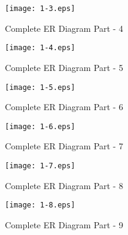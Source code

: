 \begin{figure}
\centering
\caption{Complete ER Diagram Part - 4}
\texttt{[image: 1-3.eps]}
\end{figure}

\begin{figure}
\centering
\caption{Complete ER Diagram Part - 5}
\texttt{[image: 1-4.eps]}
\end{figure}

\begin{figure}
\centering
\caption{Complete ER Diagram Part - 6}
\texttt{[image: 1-5.eps]}
\end{figure}

\begin{figure}
\centering
\caption{Complete ER Diagram Part - 7}
\texttt{[image: 1-6.eps]}
\end{figure}

\begin{figure}
\centering
\caption{Complete ER Diagram Part - 8}
\texttt{[image: 1-7.eps]}
\end{figure}

\begin{figure}
\centering
\caption{Complete ER Diagram Part - 9}
\texttt{[image: 1-8.eps]}
\end{figure}


